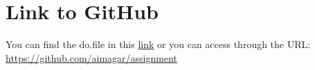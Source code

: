 \documentclass[a4paper, 12pt, twoside]{article}
\begin{document}
\newpage
\section*{Link to GitHub}
You can find the do.file in this \href{https://github.com/aimagar/assignment}{link} or you can access through the URL: \url{https://github.com/aimagar/assignment}

\newpage



\end{document}
